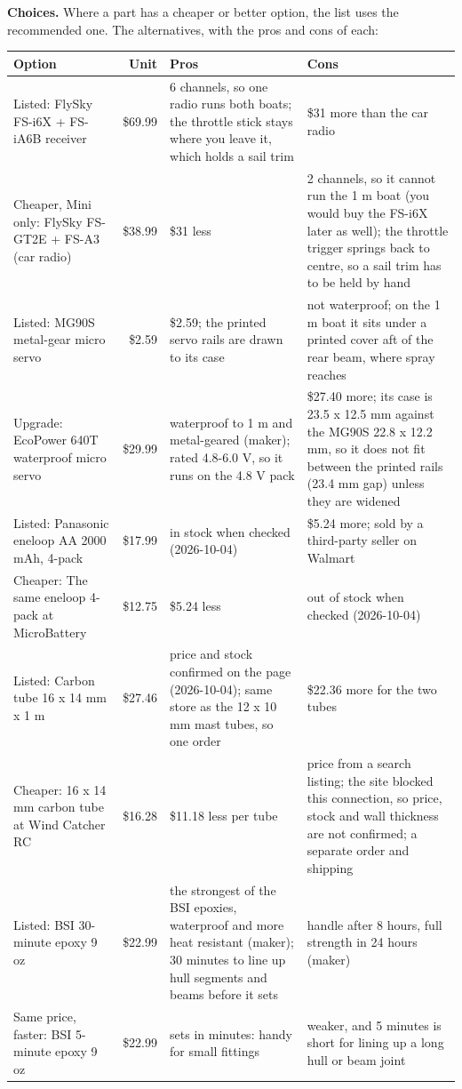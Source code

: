 \documentclass[11pt]{article}
\begin{document}
\noindent\textbf{Choices.} Where a part has a cheaper or better option, the list uses the recommended one. The alternatives, with the pros and cons of each:
{\small
\begin{longtable}{p{3.6cm}rp{5.2cm}p{5.2cm}}
\toprule
Option & Unit & Pros & Cons \\
\midrule\endhead
Listed: FlySky FS-i6X + FS-iA6B receiver & \$69.99 & 6 channels, so one radio runs both boats; the throttle stick stays where you leave it, which holds a sail trim & \$31 more than the car radio \\
Cheaper, Mini only: FlySky FS-GT2E + FS-A3 (car radio) & \$38.99 & \$31 less & 2 channels, so it cannot run the 1 m boat (you would buy the FS-i6X later as well); the throttle trigger springs back to centre, so a sail trim has to be held by hand \\
\midrule
Listed: MG90S metal-gear micro servo & \$2.59 & \$2.59; the printed servo rails are drawn to its case & not waterproof; on the 1 m boat it sits under a printed cover aft of the rear beam, where spray reaches \\
Upgrade: EcoPower 640T waterproof micro servo & \$29.99 & waterproof to 1 m and metal-geared (maker); rated 4.8-6.0 V, so it runs on the 4.8 V pack & \$27.40 more; its case is 23.5 x 12.5 mm against the MG90S 22.8 x 12.2 mm, so it does not fit between the printed rails (23.4 mm gap) unless they are widened \\
\midrule
Listed: Panasonic eneloop AA 2000 mAh, 4-pack & \$17.99 & in stock when checked (2026-10-04) & \$5.24 more; sold by a third-party seller on Walmart \\
Cheaper: The same eneloop 4-pack at MicroBattery & \$12.75 & \$5.24 less & out of stock when checked (2026-10-04) \\
\midrule
Listed: Carbon tube 16 x 14 mm x 1 m & \$27.46 & price and stock confirmed on the page (2026-10-04); same store as the 12 x 10 mm mast tubes, so one order & \$22.36 more for the two tubes \\
Cheaper: 16 x 14 mm carbon tube at Wind Catcher RC & \$16.28 & \$11.18 less per tube & price from a search listing; the site blocked this connection, so price, stock and wall thickness are not confirmed; a separate order and shipping \\
\midrule
Listed: BSI 30-minute epoxy 9 oz & \$22.99 & the strongest of the BSI epoxies, waterproof and more heat resistant (maker); 30 minutes to line up hull segments and beams before it sets & handle after 8 hours, full strength in 24 hours (maker) \\
Same price, faster: BSI 5-minute epoxy 9 oz & \$22.99 & sets in minutes: handy for small fittings & weaker, and 5 minutes is short for lining up a long hull or beam joint \\
\bottomrule
\end{longtable}}
\end{document}
